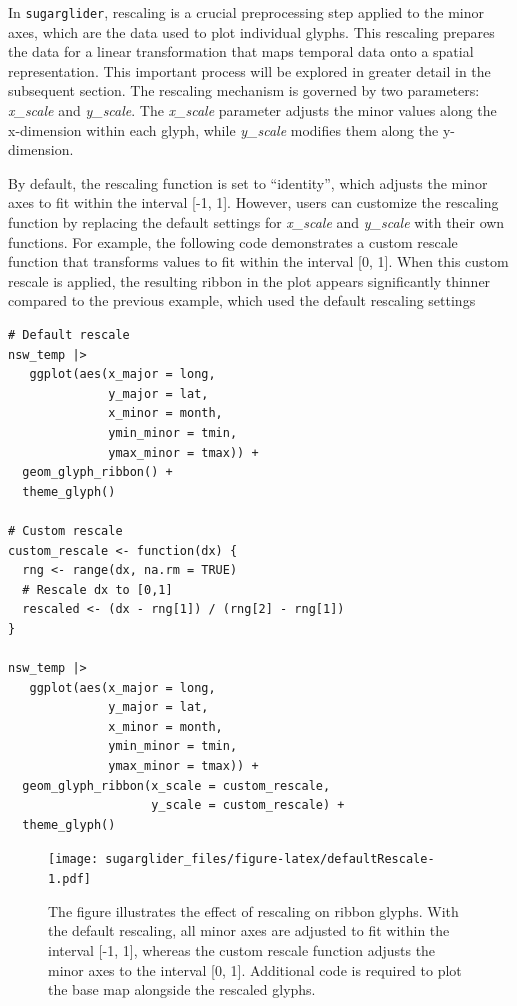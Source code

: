 In \texttt{sugarglider}, rescaling is a crucial preprocessing step applied to the minor axes, which are the data used to plot individual glyphs. This rescaling prepares the data for a linear transformation that maps temporal data onto a spatial representation. This important process will be explored in greater detail in the subsequent section. The rescaling mechanism is governed by two parameters: \emph{x\_scale} and \emph{y\_scale}. The \emph{x\_scale} parameter adjusts the minor values along the x-dimension within each glyph, while \emph{y\_scale} modifies them along the y-dimension.

By default, the rescaling function is set to ``identity'', which adjusts the minor axes to fit within the interval {[}-1, 1{]}. However, users can customize the rescaling function by replacing the default settings for \emph{x\_scale} and \emph{y\_scale} with their own functions. For example, the following code demonstrates a custom rescale function that transforms values to fit within the interval {[}0, 1{]}. When this custom rescale is applied, the resulting ribbon in the plot appears significantly thinner compared to the previous example, which used the default rescaling settings

\begin{verbatim}
# Default rescale 
nsw_temp |>
   ggplot(aes(x_major = long,
              y_major = lat,
              x_minor = month,
              ymin_minor = tmin,
              ymax_minor = tmax)) +
  geom_glyph_ribbon() +
  theme_glyph() 

# Custom rescale 
custom_rescale <- function(dx) {
  rng <- range(dx, na.rm = TRUE)
  # Rescale dx to [0,1]
  rescaled <- (dx - rng[1]) / (rng[2] - rng[1])
}

nsw_temp |>
   ggplot(aes(x_major = long,
              y_major = lat,
              x_minor = month,
              ymin_minor = tmin,
              ymax_minor = tmax)) +
  geom_glyph_ribbon(x_scale = custom_rescale,
                    y_scale = custom_rescale) +
  theme_glyph() 
\end{verbatim}

\begin{figure}
\centering
\texttt{[image: sugarglider\_files/figure-latex/defaultRescale-1.pdf]}
\caption{\label{fig:defaultRescale}The figure illustrates the effect of rescaling on ribbon glyphs. With the default rescaling, all minor axes are adjusted to fit within the interval {[}-1, 1{]}, whereas the custom rescale function adjusts the minor axes to the interval {[}0, 1{]}. Additional code is required to plot the base map alongside the rescaled glyphs.}
\end{figure}

